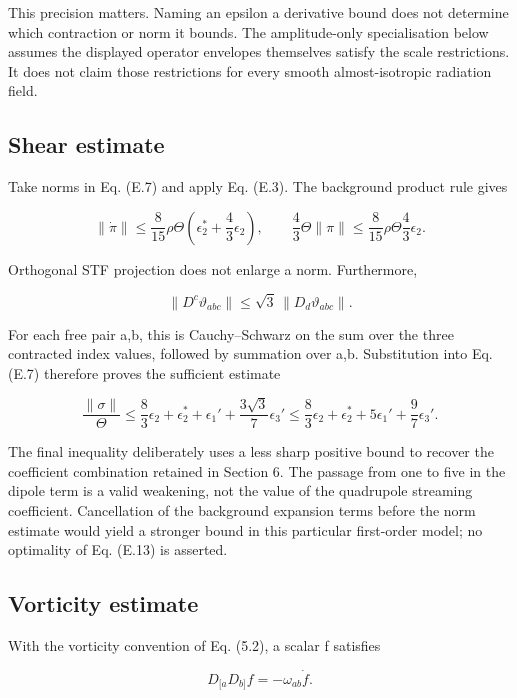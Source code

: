 \documentclass[
  11pt,
  a4paper]{article}
\begin{document}
This precision matters. Naming an epsilon a derivative bound does not determine which contraction or norm it bounds. The amplitude-only specialisation below assumes the displayed operator envelopes themselves satisfy the scale restrictions. It does not claim those restrictions for every smooth almost-isotropic radiation field.

\hypertarget{e.5-shear-estimate}{%
\subsection{Shear estimate}\label{e.5-shear-estimate}}

Take norms in Eq. (E.7) and apply Eq. (E.3). The background product rule gives

\[
\|\dot\pi\|
\le\frac8{15}\rho\Theta
\left(\epsilon_2^*+\frac43\epsilon_2\right),
\qquad
\frac43\Theta\|\pi\|\le\frac8{15}\rho\Theta\frac43\epsilon_2.
\tag{E.11}
\]

Orthogonal STF projection does not enlarge a norm. Furthermore,

\[
\|D^c\vartheta_{abc}\|\le\sqrt3\,\|D_d\vartheta_{abc}\|.
\tag{E.12}
\]

For each free pair a,b, this is Cauchy--Schwarz on the sum over the three contracted index values, followed by summation over a,b. Substitution into Eq. (E.7) therefore proves the sufficient estimate

\[
\frac{\|\sigma\|}{\Theta}
\le\frac83\epsilon_2+\epsilon_2^*+\epsilon_1'
+\frac{3\sqrt3}{7}\epsilon_3'
\le\frac83\epsilon_2+\epsilon_2^*+5\epsilon_1'
+\frac97\epsilon_3'.
\tag{E.13}
\]

The final inequality deliberately uses a less sharp positive bound to recover the coefficient combination retained in Section 6. The passage from one to five in the dipole term is a valid weakening, not the value of the quadrupole streaming coefficient. Cancellation of the background expansion terms before the norm estimate would yield a stronger bound in this particular first-order model; no optimality of Eq. (E.13) is asserted.

\hypertarget{e.6-vorticity-estimate}{%
\subsection{Vorticity estimate}\label{e.6-vorticity-estimate}}

With the vorticity convention of Eq. (5.2), a scalar f satisfies

\[
D_{[a}D_{b]}f=-\omega_{ab}\dot f.
\tag{E.14}
\]
\end{document}

